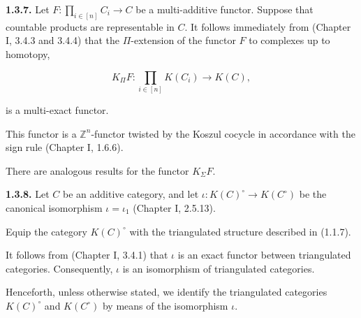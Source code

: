 \clearpage
{}%
\begingroup
\small
\setlength{\emergencystretch}{1.5em}%
\setlength{\abovedisplayskip}{4pt plus 2pt minus 2pt}%
\setlength{\belowdisplayskip}{4pt plus 2pt minus 2pt}%

\noindent\textbf{1.3.7.}\quad
{}
Let
$F\colon \prod_{i\in[n]} C_i\longrightarrow C$
be a multi-additive functor. Suppose that countable products are
representable in $C$. It follows immediately from
(Chapter I, 3.4.3 and 3.4.4) that the $\Pi$-extension of the functor $F$
to complexes up to homotopy,

\[
  K_{\Pi}F\colon \prod_{i\in[n]} K(C_i)\longrightarrow K(C),
\]

\noindent is a multi-exact functor.

This functor is a $\mathbb Z^n$-functor twisted by the Koszul cocycle in
accordance with the sign rule (Chapter I, 1.6.6).

There are analogous results for the functor $K_{\Sigma}F$.

\medskip
\noindent\textbf{1.3.8.}\quad
{}
Let $C$ be an additive category, and let
$\iota\colon K(C)^\circ\longrightarrow K(C^\circ)$ be the canonical
isomorphism $\iota=\iota_1$ (Chapter I, 2.5.13).

Equip the category $K(C)^\circ$ with the triangulated structure described
in (1.1.7).

It follows from (Chapter I, 3.4.1) that $\iota$ is an exact functor
between triangulated categories. Consequently, $\iota$ is an isomorphism
of triangulated categories.

Henceforth, unless otherwise stated, we identify the triangulated
categories $K(C)^\circ$ and $K(C^\circ)$ by means of the isomorphism
$\iota$.
\endgroup
